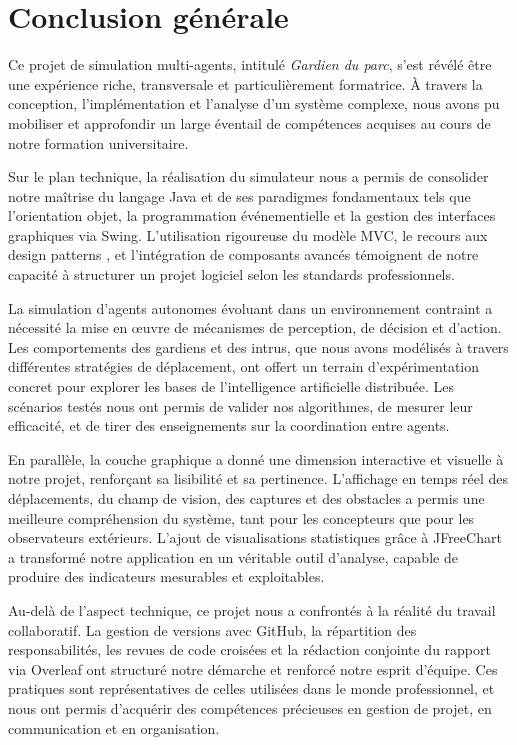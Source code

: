 
\section*{Conclusion générale}

Ce projet de simulation multi-agents, intitulé \textit{Gardien du parc}, s’est révélé être une expérience riche, transversale et particulièrement formatrice. À travers la conception, l’implémentation et l’analyse d’un système complexe, nous avons pu mobiliser et approfondir un large éventail de compétences acquises au cours de notre formation universitaire.

Sur le plan technique, la réalisation du simulateur nous a permis de consolider notre maîtrise du langage Java et de ses paradigmes fondamentaux tels que l’orientation objet, la programmation événementielle et la gestion des interfaces graphiques via Swing. L’utilisation rigoureuse du modèle MVC, le recours aux design patterns , et l’intégration de composants avancés témoignent de notre capacité à structurer un projet logiciel selon les standards professionnels.

La simulation d’agents autonomes évoluant dans un environnement contraint a nécessité la mise en œuvre de mécanismes de perception, de décision et d’action. Les comportements des gardiens et des intrus, que nous avons modélisés à travers différentes stratégies de déplacement, ont offert un terrain d’expérimentation concret pour explorer les bases de l’intelligence artificielle distribuée. Les scénarios testés nous ont permis de valider nos algorithmes, de mesurer leur efficacité, et de tirer des enseignements sur la coordination entre agents.

En parallèle, la couche graphique a donné une dimension interactive et visuelle à notre projet, renforçant sa lisibilité et sa pertinence. L’affichage en temps réel des déplacements, du champ de vision, des captures et des obstacles a permis une meilleure compréhension du système, tant pour les concepteurs que pour les observateurs extérieurs. L’ajout de visualisations statistiques grâce à JFreeChart a transformé notre application en un véritable outil d’analyse, capable de produire des indicateurs mesurables et exploitables.

Au-delà de l’aspect technique, ce projet nous a confrontés à la réalité du travail collaboratif. La gestion de versions avec GitHub, la répartition des responsabilités, les revues de code croisées et la rédaction conjointe du rapport via Overleaf ont structuré notre démarche et renforcé notre esprit d’équipe. Ces pratiques sont représentatives de celles utilisées dans le monde professionnel, et nous ont permis d’acquérir des compétences précieuses en gestion de projet, en communication et en organisation.

